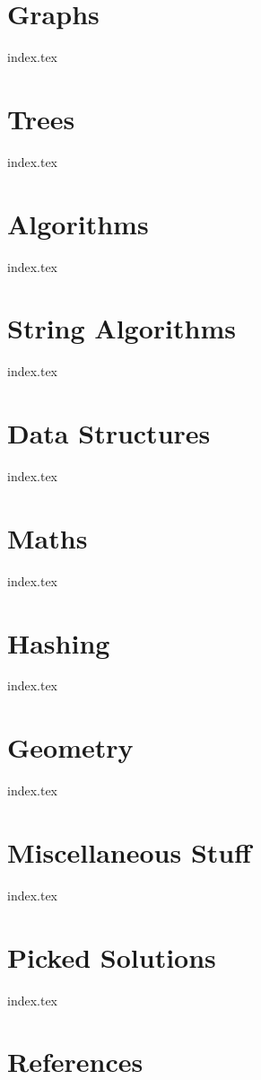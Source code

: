 \documentclass{article}
\begin{document}
\section{Graphs}

{index.tex}

\newpage

\section{Trees}

{index.tex}

\newpage

\section{Algorithms}

{index.tex}

\newpage

\section{String Algorithms}

{index.tex}

\newpage

\section{Data Structures}

{index.tex}

\newpage

\section{Maths}

{index.tex}

\newpage

\section{Hashing}

{index.tex}

\newpage

\section{Geometry}

{index.tex}

\newpage

\section{Miscellaneous Stuff}

{index.tex}

\newpage

\section{Picked Solutions}

{index.tex}

\newpage
\section{References}


\end{document}
